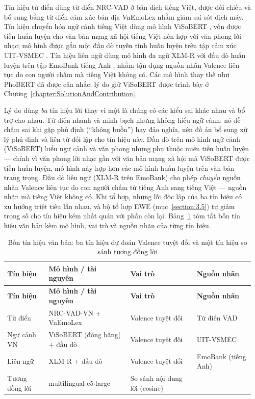 \documentclass[../DoAn.tex]{subfiles}
\begin{document}
Tín hiệu từ điển dùng từ điển NRC-VAD \cite{mohammad2018nrcvad} ở bản dịch tiếng Việt, được đối chiếu và bổ sung bằng từ điển cảm xúc bản địa VnEmoLex \cite{doan2022vnemolex} nhằm giảm sai sót dịch máy. Tín hiệu chuyển hóa ngữ cảnh tiếng Việt dùng mô hình ViSoBERT \cite{nguyen2023visobert}, vốn được tiền huấn luyện cho văn bản mạng xã hội tiếng Việt nên hợp với văn phong lời nhạc; mô hình được gắn một đầu dò tuyến tính huấn luyện trên tập cảm xúc UIT-VSMEC \cite{ho2020vsmec}. Tín hiệu liên ngữ dùng mô hình đa ngữ XLM-R \cite{conneau2020xlmr} với đầu dò huấn luyện trên tập EmoBank tiếng Anh \cite{buechel2017emobank}, nhằm tận dụng nguồn nhãn Valence liên tục do con người chấm mà tiếng Việt không có. Các mô hình thay thế như PhoBERT \cite{nguyen2020phobert} đã được cân nhắc; lý do giữ ViSoBERT được trình bày ở Chương~\ref{chapter:SolutionAndContribution}.

Lý do dùng \textit{ba} tín hiệu lời thay vì một là chúng có các kiểu sai khác nhau và bổ trợ cho nhau. Từ điển nhanh và minh bạch nhưng không hiểu ngữ cảnh: nó dễ chấm sai khi gặp phủ định (``không buồn'') hay đảo nghĩa, nên đồ án bổ sung xử lý phủ định và liên từ đối lập cho tín hiệu này. Đầu dò trên mô hình ngữ cảnh (ViSoBERT) hiểu ngữ cảnh và văn phong nhưng phụ thuộc miền tiền huấn luyện --- chính vì văn phong lời nhạc gần với văn bản mạng xã hội mà ViSoBERT được tiền huấn luyện, mô hình này hợp hơn các mô hình huấn luyện trên văn bản trang trọng. Đầu dò liên ngữ (XLM-R trên EmoBank) cho phép \textit{chuyển} nguồn nhãn Valence liên tục do con người chấm từ tiếng Anh sang tiếng Việt --- nguồn nhãn mà tiếng Việt không có. Khi tổ hợp, những lỗi độc lập của ba tín hiệu có xu hướng triệt tiêu lẫn nhau, và bộ tổ hợp EWE (mục~\ref{section:3.5}) tự giảm trọng số cho tín hiệu kém nhất quán với phần còn lại. Bảng~\ref{table:text-signals} tóm tắt bốn tín hiệu văn bản kèm mô hình, vai trò và nguồn nhãn của từng tín hiệu.

\begin{longtable}{|p{2.4cm}|p{3.1cm}|p{2.7cm}|p{3.0cm}|}
\caption{Bốn tín hiệu văn bản: ba tín hiệu dự đoán Valence tuyệt đối và một tín hiệu so sánh tương đồng lời}\label{table:text-signals}\\
\hline
\textbf{Tín hiệu} & \textbf{Mô hình / tài nguyên} & \textbf{Vai trò} & \textbf{Nguồn nhãn} \\
\hline
\endfirsthead
\hline
\textbf{Tín hiệu} & \textbf{Mô hình / tài nguyên} & \textbf{Vai trò} & \textbf{Nguồn nhãn} \\
\hline
\endhead
Từ điển & NRC-VAD-VN + VnEmoLex & Valence tuyệt đối & Từ điển VAD \cite{mohammad2018nrcvad, doan2022vnemolex} \\
\hline
Ngữ cảnh VN & ViSoBERT (đóng băng) + đầu dò & Valence tuyệt đối & UIT-VSMEC \cite{nguyen2023visobert, ho2020vsmec} \\
\hline
Liên ngữ & XLM-R + đầu dò & Valence tuyệt đối & EmoBank (tiếng Anh) \cite{conneau2020xlmr, buechel2017emobank} \\
\hline
Tương đồng lời & multilingual-e5-large & So sánh nội dung lời (cosine) & --- \cite{wang2024e5} \\
\hline
\end{longtable}
\end{document}
